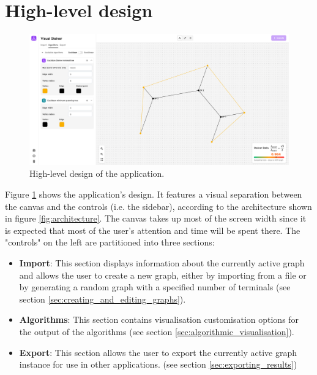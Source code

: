 \documentclass{l4proj}
\begin{document}
\section{High-level design}
\label{sec:high_level_design}
\begin{figure}[h]
    \centering
    \begin{tcolorbox}[colframe=gray!20, colback=gray!5, boxrule=1pt, arc=0mm, boxsep=0pt, left=0pt, right=0pt, top=0pt, bottom=0pt]
        \includegraphics[width=\textwidth]{images/app_overview.png}
    \end{tcolorbox}

    \caption{High-level design of the application.}
    \label{fig:high_level_design}
\end{figure}
Figure \ref{fig:high_level_design} shows the application's design. It features a visual separation between the canvas and the controls (i.e. the sidebar), according to the architecture shown in figure \ref{fig:architecture}.
The canvas takes up most of the screen width since it is expected that most of the user's attention and time will be spent there. The "controls" on the left are partitioned into three sections:
\begin{itemize}
    \item \textbf{Import}: This section displays information about the currently active graph and allows the user to create a new graph, either by importing from a file or by generating a random graph with a specified number of terminals (see section \ref{sec:creating_and_editing_graphs}).
    \item \textbf{Algorithms}: This section contains visualisation customisation options for the output of the algorithms (see section \ref{sec:algorithmic_visualisation}).
    \item \textbf{Export}: This section allows the user to export the currently active graph instance for use in other applications. (see section \ref{sec:exporting_results})
\end{itemize}
\end{document}

